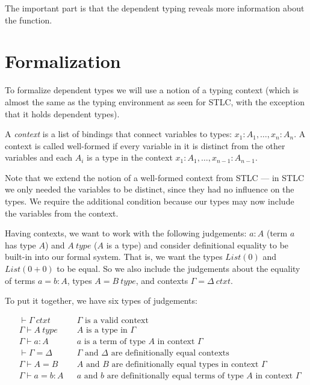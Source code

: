 The important part is that the dependent typing reveals more information about
the function.

\section*{Formalization}

To formalize dependent types we will use a notion of a typing context (which is
almost the same as the typing environment as seen for STLC, with the exception
that it holds dependent types).

\begin{definition}[Context]
  A \emph{context} is a list of bindings that connect variables to types: $x_1: A_1,
  \dots, x_n: A_n$. A context is called well-formed if every variable in it is
  distinct from the other variables and each $A_i$ is a type in the context $x_1
  : A_1, \dots, x_{n-1} : A_{n-1}$.
\end{definition}

Note that we extend the notion of a well-formed context from STLC --- in STLC
we only needed the variables to be distinct, since they had no influence on the
types. We require the additional condition because our types may now include
the variables from the context.

Having contexts, we want to work with the following judgements: $a : A$ (term
$a$ has type $A$) and $A~type$ ($A$ is a type) and consider definitional
equality to be built-in into our formal system. That is, we want the types
$List(0)$ and $List(0 + 0)$ to be equal. So we also include the judgements
about the equality of terms $a = b : A$, types $A = B~type$, and contexts
$\Gamma = \Delta~ctxt$.

To put it together, we have six types of judgements:

\begin{align*}
  &\vdash \Gamma~ctxt && \text{$\Gamma$ is a valid context} \\
  &\Gamma \vdash A~type && \text{$A$ is a type in $\Gamma$} \\
  &\Gamma \vdash a : A && \text{$a$ is a term of type $A$ in context $\Gamma$} \\
  &\vdash \Gamma = \Delta && \text{$\Gamma$ and $\Delta$ are definitionally equal contexts} \\
  &\Gamma \vdash A = B && \text{$A$ and $B$ are definitionally equal types in context $\Gamma$} \\
  &\Gamma \vdash a = b : A && \text{$a$ and $b$ are definitionally equal terms of type $A$ in context $\Gamma$}
\end{align*}

